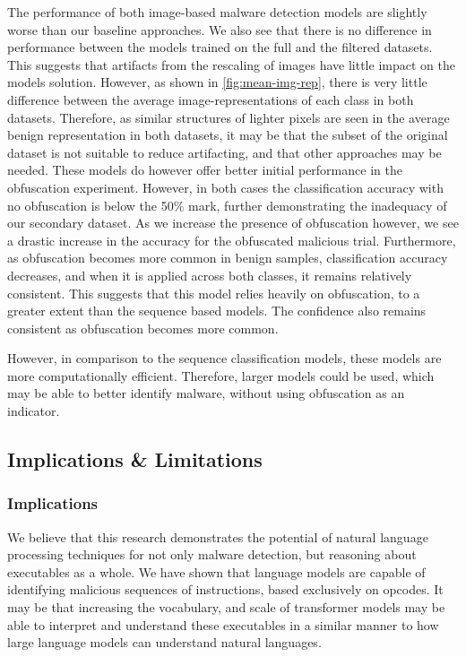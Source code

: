 \documentclass[conference,compsoc]{IEEEtran}
\begin{document}
The performance of both image-based malware detection models are slightly worse than our baseline approaches. We also see that there is no difference in performance between the models trained on the full and the filtered datasets. This suggests that artifacts from the rescaling of images have little impact on the models solution. However, as shown in \ref{fig:mean-img-rep}, there is very little difference between the average image-representations of each class in both datasets. Therefore, as similar structures of lighter pixels are seen in the average benign representation in both datasets, it may be that the subset of the original dataset is not suitable to reduce artifacting, and that other approaches may be needed.  
These models do however offer better initial performance in the obfuscation experiment. However, in both cases the classification accuracy with no obfuscation is below the 50\% mark, further demonstrating the inadequacy of our secondary dataset. As we increase the presence of obfuscation however, we see a drastic increase in the accuracy for the obfuscated malicious trial. Furthermore, as obfuscation becomes more common in benign samples, classification accuracy decreases, and when it is applied across both classes, it remains relatively consistent. This suggests that this model relies heavily on obfuscation, to a greater extent than the sequence based models. The confidence also remains consistent as obfuscation becomes more common. 

However, in comparison to the sequence classification models, these models are more computationally efficient. Therefore, larger models could be used, which may be able to better identify malware, without using obfuscation as an indicator. 


\subsection{Implications \& Limitations}

\subsubsection{Implications}

We believe that this research demonstrates the potential of natural language processing techniques for not only malware detection, but reasoning about executables as a whole. We have shown that language models are capable of identifying malicious sequences of instructions, based exclusively on opcodes. It may be that increasing the vocabulary, and scale of transformer models may be able to interpret and understand these executables in a similar manner to how large language models can understand natural languages. 
\end{document}
